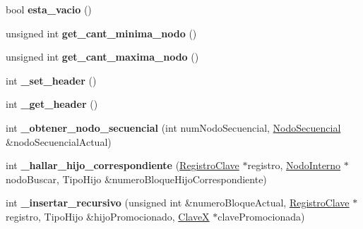 \begin{DoxyCompactItemize}
\item 
\hypertarget{class_arbol_b_mas_a2e1d54fa50e70fa97438f9f8957e2bc6}{bool {\bfseries esta\-\_\-vacio} ()}\label{class_arbol_b_mas_a2e1d54fa50e70fa97438f9f8957e2bc6}

\item 
\hypertarget{class_arbol_b_mas_abae4a1e6471d39b90a826bb44327e765}{unsigned int {\bfseries get\-\_\-cant\-\_\-minima\-\_\-nodo} ()}\label{class_arbol_b_mas_abae4a1e6471d39b90a826bb44327e765}

\item 
\hypertarget{class_arbol_b_mas_ab3a4693a902888b7cfcc5ad2cc2742cb}{unsigned int {\bfseries get\-\_\-cant\-\_\-maxima\-\_\-nodo} ()}\label{class_arbol_b_mas_ab3a4693a902888b7cfcc5ad2cc2742cb}

\item 
\hypertarget{class_arbol_b_mas_ace1fbc38270af7ec2ee14ddf62865b7d}{int {\bfseries \-\_\-set\-\_\-header} ()}\label{class_arbol_b_mas_ace1fbc38270af7ec2ee14ddf62865b7d}

\item 
\hypertarget{class_arbol_b_mas_ac50d3c216008f87f426f1d547fc2ef66}{int {\bfseries \-\_\-get\-\_\-header} ()}\label{class_arbol_b_mas_ac50d3c216008f87f426f1d547fc2ef66}

\item 
\hypertarget{class_arbol_b_mas_a71cf22d61ec63fb5ef6c355499ac18b8}{int {\bfseries \-\_\-obtener\-\_\-nodo\-\_\-secuencial} (int num\-Nodo\-Secuencial, \hyperlink{class_nodo_secuencial}{\-Nodo\-Secuencial} \&nodo\-Secuencial\-Actual)}\label{class_arbol_b_mas_a71cf22d61ec63fb5ef6c355499ac18b8}

\item 
\hypertarget{class_arbol_b_mas_a848efb5b5e26dc7c8e44e4a1620845e5}{int {\bfseries \-\_\-hallar\-\_\-hijo\-\_\-correspondiente} (\hyperlink{class_registro_clave}{\-Registro\-Clave} $\ast$registro, \hyperlink{class_nodo_interno}{\-Nodo\-Interno} $\ast$nodo\-Buscar, \-Tipo\-Hijo \&numero\-Bloque\-Hijo\-Correspondiente)}\label{class_arbol_b_mas_a848efb5b5e26dc7c8e44e4a1620845e5}

\item 
\hypertarget{class_arbol_b_mas_ad04b37c8bc2e945f5491f594e7745f6b}{int {\bfseries \-\_\-insertar\-\_\-recursivo} (unsigned int \&numero\-Bloque\-Actual, \hyperlink{class_registro_clave}{\-Registro\-Clave} $\ast$registro, \-Tipo\-Hijo \&hijo\-Promocionado, \hyperlink{class_clave_x}{\-Clave\-X} $\ast$clave\-Promocionada)}\label{class_arbol_b_mas_ad04b37c8bc2e945f5491f594e7745f6b}


\end{DoxyCompactItemize}
